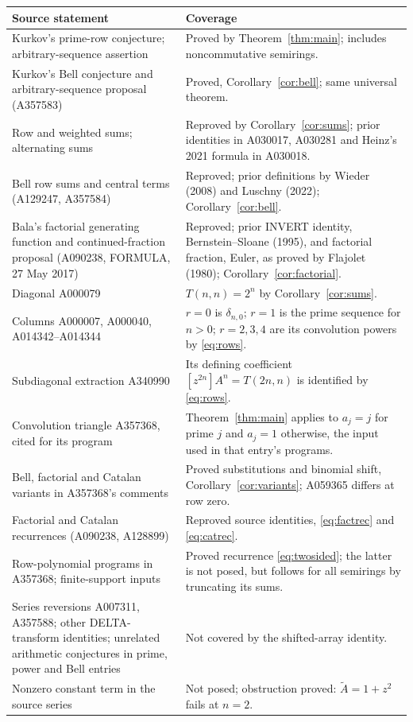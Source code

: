 \documentclass[11pt]{article}
\begin{document}
\small
\begin{longtable}{@{}>{\raggedright\arraybackslash}p{}>{\raggedright\arraybackslash}p{}@{}}
\toprule
Source statement & Coverage\\
\midrule
\endhead
Kurkov's prime-row conjecture; arbitrary-sequence assertion
& Proved by Theorem~\ref{thm:main}; includes noncommutative semirings.\\[3pt]
Kurkov's Bell conjecture and arbitrary-sequence proposal (A357583)
& Proved, Corollary~\ref{cor:bell}; same universal theorem.\\[3pt]
Row and weighted sums; alternating sums
& Reproved by Corollary~\ref{cor:sums}; prior identities in A030017,
A030281 and Heinz's 2021 formula in A030018.\\[3pt]
Bell row sums and central terms (A129247, A357584)
& Reproved; prior definitions by Wieder (2008) and Luschny (2022);
Corollary~\ref{cor:bell}.\\[3pt]
Bala's factorial generating function and continued-fraction proposal
(A090238, FORMULA, 27 May 2017)
& Reproved; prior INVERT identity, Bernstein--Sloane (1995), and
factorial fraction, Euler, as proved by Flajolet (1980);
Corollary~\ref{cor:factorial}.\\[3pt]
Diagonal A000079
& $T(n,n)=2^n$ by Corollary~\ref{cor:sums}.\\[3pt]
Columns A000007, A000040, A014342--A014344
& $r=0$ is $\delta_{n,0}$; $r=1$ is the prime sequence for $n>0$;
$r=2,3,4$ are its convolution powers by \eqref{eq:rows}.\\[3pt]
Subdiagonal extraction A340990
& Its defining coefficient $[z^{2n}]A^n=T(2n,n)$ is identified by
\eqref{eq:rows}.\\[3pt]
Convolution triangle A357368, cited for its program
& Theorem~\ref{thm:main} applies to $a_j=j$ for prime $j$ and $a_j=1$
otherwise, the input used in that entry's programs.\\
Bell, factorial and Catalan variants in A357368's comments
& Proved substitutions and binomial shift, Corollary~\ref{cor:variants};
A059365 differs at row zero.\\[3pt]
Factorial and Catalan recurrences (A090238, A128899)
& Reproved source identities, \eqref{eq:factrec} and \eqref{eq:catrec}.\\[3pt]
Row-polynomial programs in A357368; finite-support inputs
& Proved recurrence \eqref{eq:twosided}; the latter is not posed,
but follows for all semirings by truncating its sums.\\[3pt]
Series reversions A007311, A357588; other DELTA-transform identities;
unrelated arithmetic conjectures in prime, power and Bell entries
& Not covered by the shifted-array identity.\\[3pt]
Nonzero constant term in the source series
& Not posed; obstruction proved: $\widetilde A=1+z^2$ fails at $n=2$.\\
\bottomrule
\end{longtable}
\normalsize
\end{document}
